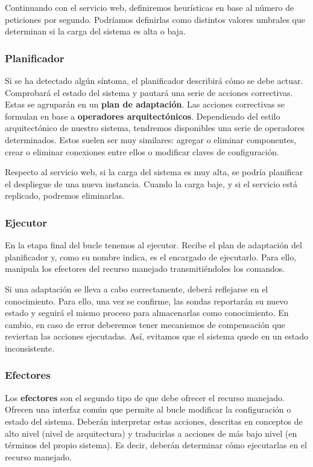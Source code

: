 Continuando con el servicio web, definiremos heurísticas en base al número de peticiones por segundo. Podríamos definirlas como distintos valores umbrales que determinan si la carga del sistema es alta o baja.

\subsubsection{Planificador}

Si se ha detectado algún síntoma, el planificador describirá cómo se debe actuar. Comprobará el estado del sistema y pautará una serie de acciones correctivas. Estas se agruparán en un \textbf{plan de adaptación}. Las acciones correctivas se formulan en base a \textbf{operadores arquitectónicos}. \cite{garlanIncreasingSystemDependability2003} Dependiendo del estilo arquitectónico de nuestro sistema, tendremos disponibles una serie de operadores determinados. Estos suelen ser muy similares: agregar o eliminar componentes, crear o eliminar conexiones entre ellos o modificar claves de configuración.

Respecto al servicio web, si la carga del sistema es muy alta, se podría planificar
el despliegue de una nueva instancia. Cuando la carga baje, y si el servicio está replicado, podremos eliminarlas.

\subsubsection{Ejecutor}

En la etapa final del bucle tenemos al ejecutor. Recibe el plan de adaptación del planificador y, como su nombre indica, es el encargado de ejecutarlo. Para ello, manipula los efectores del recurso manejado transmitiéndoles los comandos.

Si una adaptación se lleva a cabo correctamente, deberá reflejarse en el conocimiento. Para ello, una vez se confirme, las sondas reportarán su nuevo estado y seguirá el mismo proceso para almacenarlas como conocimiento. En cambio, en caso de error deberemos tener mecanismos de compensación que reviertan las acciones ejecutadas. Así, evitamos que el sistema quede en un estado inconsistente.

\subsubsection{Efectores}

Los \textbf{efectores} son el segundo tipo de  que debe ofrecer el recurso manejado. Ofrecen una interfaz común que permite al bucle modificar la configuración o estado del sistema. Deberán interpretar estas acciones, descritas en conceptos de alto nivel (nivel de arquitectura) y traducirlas a acciones de más bajo nivel (en términos del propio sistema). \cite{garlanIncreasingSystemDependability2003} Es decir, deberán determinar cómo ejecutarlas en el recurso manejado.

